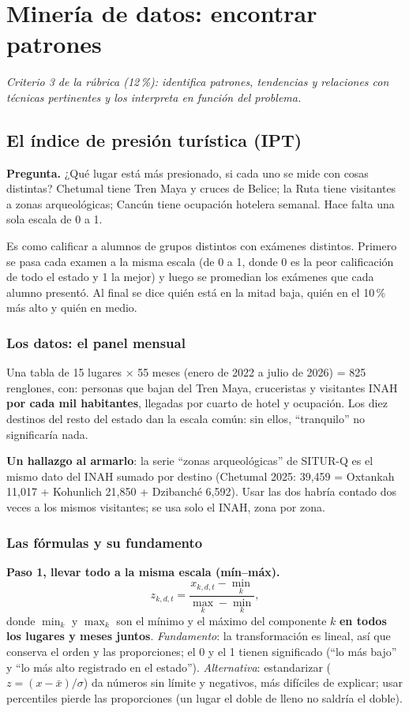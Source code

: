 \chapter{Minería de datos: encontrar patrones}
\label{cap:mineria}
\textit{Criterio 3 de la rúbrica (12\,\%): identifica patrones, tendencias y relaciones con técnicas pertinentes y los
interpreta en función del problema.}

\section{El índice de presión turística (IPT)}
\label{sec:ipt}
\textbf{Pregunta.} ¿Qué lugar está más presionado, si cada uno se mide con cosas distintas? Chetumal tiene Tren Maya y
cruces de Belice; la Ruta tiene visitantes a zonas arqueológicas; Cancún tiene ocupación hotelera semanal. Hace falta una
sola escala de 0 a 1.

\begin{intuicion}
Es como calificar a alumnos de grupos distintos con exámenes distintos. Primero se pasa cada examen a la misma escala
(de 0 a 1, donde 0 es la peor calificación de todo el estado y 1 la mejor) y luego se promedian los exámenes que cada
alumno presentó. Al final se dice quién está en la mitad baja, quién en el 10\,\% más alto y quién en medio.
\end{intuicion}

\subsection{Los datos: el panel mensual}
Una tabla de 15 lugares $\times$ 55 meses (enero de 2022 a julio de 2026) = 825 renglones, con: personas que bajan del
Tren Maya, cruceristas y visitantes INAH \textbf{por cada mil habitantes}, llegadas por cuarto de hotel y ocupación. Los
diez destinos del resto del estado dan la escala común: sin ellos, ``tranquilo'' no significaría nada.

\textbf{Un hallazgo al armarlo}: la serie ``zonas arqueológicas'' de SITUR-Q es el mismo dato del INAH sumado por destino
(Chetumal 2025: 39,459 = Oxtankah 11,017 + Kohunlich 21,850 + Dzibanché 6,592). Usar las dos habría contado dos veces a
los mismos visitantes; se usa solo el INAH, zona por zona.

\subsection{Las fórmulas y su fundamento}
\textbf{Paso 1, llevar todo a la misma escala (mín–máx).}
\[
z_{k,d,t}=\frac{x_{k,d,t}-\min_k}{\max_k-\min_k},
\]
donde $\min_k$ y $\max_k$ son el mínimo y el máximo del componente $k$ \textbf{en todos los lugares y meses juntos}.
\emph{Fundamento}: la transformación es lineal, así que conserva el orden y las proporciones; el 0 y el 1 tienen
significado (``lo más bajo'' y ``lo más alto registrado en el estado''). \emph{Alternativa}: estandarizar
($z=(x-\bar x)/\sigma$) da números sin límite y negativos, más difíciles de explicar; usar percentiles pierde las
proporciones (un lugar el doble de lleno no saldría el doble).

